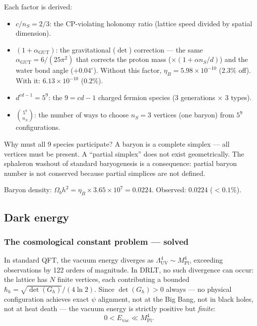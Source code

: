 \documentclass[12pt]{article}
\theoremstyle{remark}
\theoremstyle{definition}
\begin{document}
Each factor is derived:
\begin{itemize}
\item $c/n_S = 2/3$: the CP-violating holonomy ratio (lattice speed divided by spatial dimension).
\item $(1 + \alpha_\text{GUT})$: the gravitational ($\det$) correction --- the same $\alpha_\text{GUT} = 6/(25\pi^2)$ that corrects the proton mass ($\times(1 + \alpha n_S/d)$) and the water bond angle ($+0.04^\circ$). Without this factor, $\eta_B = 5.98 \times 10^{-10}$ ($2.3\%$ off). With it: $6.13 \times 10^{-10}$ ($0.2\%$).
\item $d^{cd-1} = 5^9$: the $9 = cd - 1$ charged fermion species ($3$ generations $\times$ $3$ types).
\item $\binom{5^9}{n_S}$: the number of ways to choose $n_S = 3$ vertices (one baryon) from $5^9$ configurations.
\end{itemize}

Why must all 9 species participate? A baryon is a complete simplex --- all vertices must be present. A ``partial simplex'' does not exist geometrically. The sphaleron washout of standard baryogenesis is a consequence: partial baryon number is not conserved because partial simplices are not defined.

Baryon density: $\Omega_b h^2 = \eta_B \times 3.65 \times 10^7 = 0.0224$. Observed: $0.0224$ ($< 0.1\%$).

\subsection{Dark energy}

\subsubsection{The cosmological constant problem --- solved}

In standard QFT, the vacuum energy diverges as $\Lambda^4_\text{UV} \sim M_\text{Pl}^4$, exceeding observations by 122 orders of magnitude. In DRLT, no such divergence can occur: the lattice has $N$ finite vertices, each contributing a bounded $\hbar_h = \sqrt{\det(G_h)}/(4\ln 2)$. Since $\det(G_h) > 0$ always --- no physical configuration achieves exact $\psi$ alignment, not at the Big Bang, not in black holes, not at heat death --- the vacuum energy is strictly positive but \emph{finite}:
\begin{equation}
0 < E_\text{vac} \ll M_\text{Pl}^4.
\end{equation}
\end{document}
